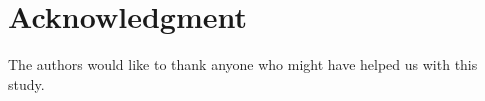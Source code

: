 \documentclass[conference]{IEEEtran}
\begin{document}






\section*{Acknowledgment}

The authors would like to thank anyone who might have helped us with this study.









%
%
%




\end{document}
